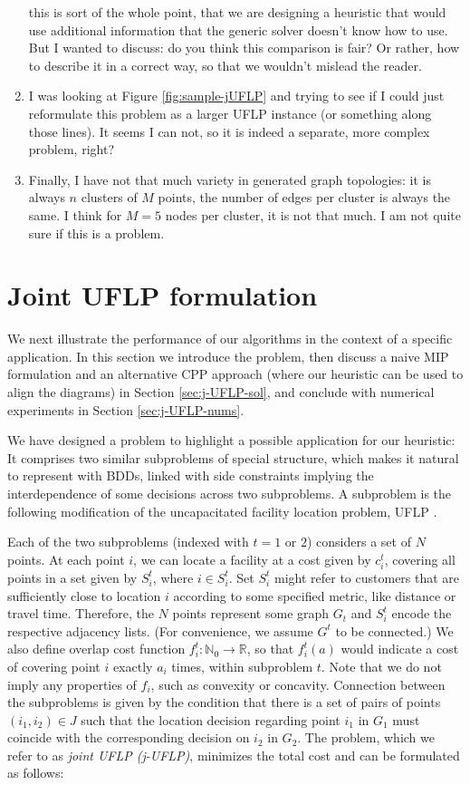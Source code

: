 \documentclass[11pt]{article}
\begin{document}
\begin{enumerate}
this is sort of the whole point, that we are designing a heuristic that would
use additional information that the generic solver doesn't know how to use.
But I wanted to discuss: do you think this comparison is fair? Or rather, how
to describe it in a correct way, so that we wouldn't mislead the reader.
\item I was looking at Figure \ref{fig:sample-jUFLP} and trying to see if I could
just reformulate this problem as a larger UFLP instance (or something along
those lines). It seems I can not, so it is indeed a separate, more complex
problem, right?
\item Finally, I have not that much variety in generated graph topologies: it is
always \(n\) clusters of \(M\) points, the number of edges per cluster is always
the same. I think for \(M=5\) nodes per cluster, it is not that much. I am not
quite sure if this is a problem.
\end{enumerate}

\section{Joint UFLP formulation}
\label{sec:jUFLP}
We next illustrate the performance of our algorithms in the context of a
specific application. In this section we introduce the problem, then discuss a
naive MIP formulation and an alternative CPP approach (where our heuristic can
be used to align the diagrams) in Section \ref{sec:j-UFLP-sol}, and conclude with
numerical experiments in Section \ref{sec:j-UFLP-nums}.

We have designed a problem to highlight a possible application for our
heuristic: It comprises two similar subproblems of special structure, which
makes it natural to represent with BDDs, linked with side constraints implying
the interdependence of some decisions across two subproblems. A subproblem is
the following modification of the uncapacitated facility location problem, UFLP
\citep{owen1998,revelle2008}.

Each of the two subproblems (indexed with \(t=1\) or \(2\)) considers a set of \(N\)
points. At each point \(i\), we can locate a facility at a cost given by \(c^t_i\),
covering all points in a set given by \(S^t_i\), where \(i \in S^t_i\). Set \(S^t_i\)
might refer to customers that are sufficiently close to location \(i\) according
to some specified metric, like distance or travel time. Therefore, the \(N\)
points represent some graph \(G_t\) and \(S^t_i\) encode the respective adjacency
lists. (For convenience, we assume \(G^t\) to be connected.) We also define
overlap cost function \(f^t_i: \mathbb{N}_0\rightarrow\mathbb{R}\), so that
\(f^t_i(a)\) would indicate a cost of covering point \(i\) exactly \(a_i\) times,
within subproblem \(t\). Note that we do not imply any properties of \(f_i\), such
as convexity or concavity. Connection between the subproblems is given by the
condition that there is a set of pairs of points \((i_1, i_2) \in J\) such that
the location decision regarding point \(i_1\) in \(G_1\) must coincide with the
corresponding decision on \(i_2\) in \(G_2\). The problem, which we refer to as
\emph{joint UFLP (j-UFLP)}, minimizes the total cost and can be formulated as follows:
\end{document}
